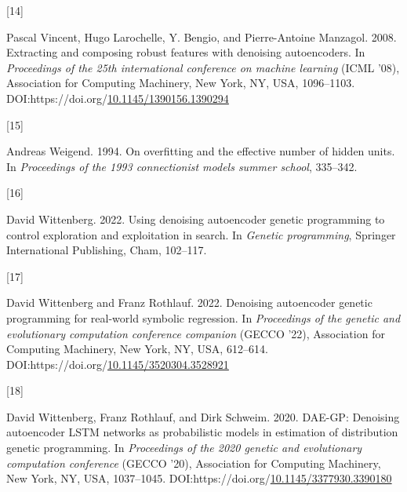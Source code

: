 \documentclass[
  11pt,
]{article}
\newlength{\cslhangindent}
\newlength{\csllabelwidth}
\newlength{\cslentryspacingunit} %
\newenvironment{CSLReferences}[2] %
 {%
  \setlength{\parindent}{0pt}
  \ifodd #1
  \let\oldpar\par
  \def\par{\hangindent=\cslhangindent\oldpar}
  \fi
  \setlength{\parskip}{#2\cslentryspacingunit}
 }%
 {}
\newcommand{\CSLLeftMargin}[1]{\parbox[t]{\csllabelwidth}{#1}}
\newcommand{\CSLRightInline}[1]{\parbox[t]{\linewidth - \csllabelwidth}{#1}\break}
\begin{document}
\begin{CSLReferences}{0}{0}
\leavevmode{}%
\CSLLeftMargin{{[}14{]} }%
\CSLRightInline{Pascal Vincent, Hugo Larochelle, Y. Bengio, and Pierre-Antoine Manzagol. 2008. Extracting and composing robust features with denoising autoencoders. In \emph{Proceedings of the 25th international conference on machine learning} (ICML '08), Association for Computing Machinery, New York, NY, USA, 1096--1103. DOI:https://doi.org/\href{https://doi.org/10.1145/1390156.1390294}{10.1145/1390156.1390294}}

\leavevmode{}%
\CSLLeftMargin{{[}15{]} }%
\CSLRightInline{Andreas Weigend. 1994. On overfitting and the effective number of hidden units. In \emph{Proceedings of the 1993 connectionist models summer school}, 335--342.}

\leavevmode{}%
\CSLLeftMargin{{[}16{]} }%
\CSLRightInline{David Wittenberg. 2022. Using denoising autoencoder genetic programming to control exploration and exploitation in search. In \emph{Genetic programming}, Springer International Publishing, Cham, 102--117.}

\leavevmode{}%
\CSLLeftMargin{{[}17{]} }%
\CSLRightInline{David Wittenberg and Franz Rothlauf. 2022. Denoising autoencoder genetic programming for real-world symbolic regression. In \emph{Proceedings of the genetic and evolutionary computation conference companion} (GECCO '22), Association for Computing Machinery, New York, NY, USA, 612--614. DOI:https://doi.org/\href{https://doi.org/10.1145/3520304.3528921}{10.1145/3520304.3528921}}

\leavevmode{}%
\CSLLeftMargin{{[}18{]} }%
\CSLRightInline{David Wittenberg, Franz Rothlauf, and Dirk Schweim. 2020. DAE-GP: Denoising autoencoder LSTM networks as probabilistic models in estimation of distribution genetic programming. In \emph{Proceedings of the 2020 genetic and evolutionary computation conference} (GECCO '20), Association for Computing Machinery, New York, NY, USA, 1037--1045. DOI:https://doi.org/\href{https://doi.org/10.1145/3377930.3390180}{10.1145/3377930.3390180}}

\end{CSLReferences}
\end{document}
